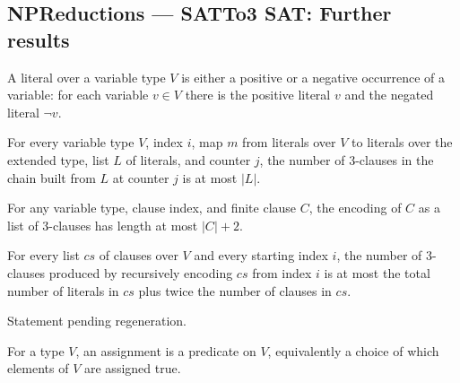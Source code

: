\subsection*{NPReductions --- SATTo3 SAT: Further results}

\begin{definition}
\label{SATTo3SAT.Literal}
\leanok
A literal over a variable type $V$ is either a positive or a negative occurrence of a
variable: for each variable $v \in V$ there is the positive literal $v$ and the negated
literal $\lnot v$.
\end{definition}

\begin{theorem}
\label{SATTo3SAT.length_buildChain_le}
\leanok
{}
For every variable type $V$, index $i$, map $m$ from literals over $V$ to literals over
the extended type, list $L$ of literals, and counter $j$, the number of 3-clauses in the
chain built from $L$ at counter $j$ is at most $|L|$.
\end{theorem}

\begin{theorem}
\label{SATTo3SAT.length_transformClause_le}
\leanok
{}
For any variable type, clause index, and finite clause $C$, the encoding of $C$ as a
list of 3-clauses has length at most $|C|+2$.
\end{theorem}

\begin{theorem}
\label{SATTo3SAT.length_to3SATAux_le}
\leanok
{}
For every list $cs$ of clauses over $V$ and every starting index $i$, the number of
3-clauses produced by recursively encoding $cs$ from index $i$ is at most the total
number of literals in $cs$ plus twice the number of clauses in $cs$.
\end{theorem}

\begin{theorem}
\label{SATTo3SAT.length_to3SAT_le}
\leanok
{}
Statement pending regeneration.
\end{theorem}

\begin{definition}
\label{SATTo3SAT.Assignment}
\leanok
For a type $V$, an assignment is a predicate on $V$, equivalently a choice of which
elements of $V$ are assigned true.
\end{definition}
